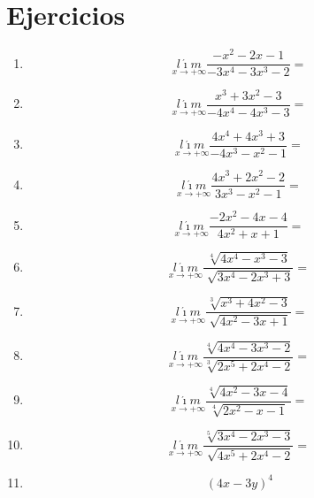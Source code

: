 \documentclass[oneside,spanish,letter]{article}
\begin{document}
\section{Ejercicios}
\begin{enumerate}
 \item $$\underset{x\rightarrow +\infty}{l\acute{\imath}m} \frac{-x^2-2x-1}{-3x^4-3x^3-2}=$$
 \item $$\underset{x\rightarrow +\infty}{l\acute{\imath}m} \frac{x^3+3x^2-3}{-4x^4-4x^3-3}=$$
 \item $$\underset{x\rightarrow +\infty}{l\acute{\imath}m} \frac{4x^4+4x^3+3}{-4x^3-x^2-1}=$$
 \item $$\underset{x\rightarrow +\infty}{l\acute{\imath}m} \frac{4x^3+2x^2-2}{3x^3-x^2-1}=$$
 \item $$\underset{x\rightarrow +\infty}{l\acute{\imath}m} \frac{-2x^2-4x-4}{4x^2+x+1}=$$
 \item $$\underset{x\rightarrow +\infty}{l\acute{\imath}m} \frac{\sqrt[4]{4x^4-x^3-3}}{\sqrt[]{3x^4-2x^3+3}}=$$
 \item $$\underset{x\rightarrow +\infty}{l\acute{\imath}m} \frac{\sqrt[3]{x^3+4x^2-3}}{\sqrt[]{4x^2-3x+1}}=$$
 \item $$\underset{x\rightarrow +\infty}{l\acute{\imath}m} \frac{\sqrt[4]{4x^4-3x^3-2}}{\sqrt[3]{2x^5+2x^4-2}}=$$
 \item $$\underset{x\rightarrow +\infty}{l\acute{\imath}m} \frac{\sqrt[4]{4x^2-3x-4}}{\sqrt[4]{2x^2-x-1}}=$$
 \item $$\underset{x\rightarrow +\infty}{l\acute{\imath}m} \frac{\sqrt[5]{3x^4-2x^3-3}}{\sqrt[]{4x^5+2x^4-2}}=$$
\item $$(4x-3y)^4$$
 \end{enumerate}
  \newpage
\end{document}
